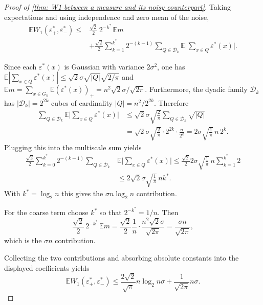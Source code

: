 \documentclass{article}
\theoremstyle{plain}
\theoremstyle{definition}
\theoremstyle{remark}
\begin{document}
\begin{proof}[Proof of \cref{thm: W1 between a measure and its noisy counterpart}]
Taking expectations and using independence and zero mean of the noise,
\begin{align}
    \mathbb{E} W_1(\varepsilon^*_+,\varepsilon^*_-)
    \le& \frac{\sqrt2}{2}\,2^{-k^*}\,\mathbb{E} m 
    \\&+ \frac{\sqrt2}{2} \sum_{k=1}^{k^*} 2^{-(k-1)} \sum_{Q\in\mathcal{D}_k} \mathbb{E}\Big| \sum_{x\in Q} \varepsilon^*(x) \Big|. \nonumber
\end{align}

Since each $\varepsilon^*(x)$ is Gaussian with variance $2\sigma^2$, one has $\mathbb{E}|\sum_{x\in Q}\varepsilon^*(x)| \le \sqrt2\sigma \sqrt{|Q|}\sqrt{2/\pi}$ and $\mathbb{E} m = \sum_{x\in G_n} \mathbb{E}(\varepsilon^*(x))_+ = n^2 \sqrt2\sigma/\sqrt{2\pi}$. Furthermore, the dyadic family $\mathcal{D}_k$ has $|\mathcal{D}_k|=2^{2k}$ cubes of cardinality $|Q|=n^2/2^{2k}$. Therefore
\begin{align}
    \sum_{Q\in\mathcal{D}_k} \mathbb{E}\Big| \sum_{x\in Q} \varepsilon^*(x) \Big|
    &\le \sqrt{2} \sigma \sqrt{\tfrac{2}{\pi}} \sum_{Q\in\mathcal{D}_k} \sqrt{|Q|}
    \\&= \sqrt{2}\sigma \sqrt{\tfrac{2}{\pi}} \cdot 2^{2k} \cdot \frac{n}{2^{k}}
    = 2\sigma \sqrt{\tfrac{1}{\pi}}\, n\, 2^{k}. \nonumber
\end{align}
Plugging this into the multiscale sum yields
\begin{align}
    \frac{\sqrt2}{2} \sum_{k=0}^{k^*} 2^{-(k-1)} \sum_{Q\in\mathcal{D}_k} &\mathbb{E}\Big| \sum_{x\in Q} \varepsilon^*(x) \Big| \nonumber
    \le \frac{\sqrt2}{2} 2 \sigma \sqrt{\tfrac{1}{\pi}}\, n \sum_{k=1}^{k^*} 2
    \\&\le 2 \sqrt2 \sigma \sqrt{\tfrac{1}{\pi}}\, n k^*.
\end{align}
With $k^*= \log_2 n$ this gives the $\sigma n \log_2 n$ contribution.

For the coarse term choose $k^*$ so that $2^{-k^*} = 1/n$. Then
\begin{equation}
    \frac{\sqrt2}{2}\,2^{-k^*}\,\mathbb{E} m 
    = \frac{\sqrt2}{2} \frac{1}{n}\cdot \frac{n^2 \sqrt2\sigma}{\sqrt{2\pi}} 
    = \frac{\sigma n}{\sqrt{2\pi}},
\end{equation}
which is the $\sigma n$ contribution.

Collecting the two contributions and absorbing absolute constants into the displayed coefficients yields
\begin{equation}\label{eq: bound on the expectation of W1 between noises}
    \mathbb{E} W_1(\varepsilon^*_+,\varepsilon^*_-)
    \le \frac{2\sqrt2}{\sqrt{\pi}} n \log_2 n \sigma+ \frac{1}{\sqrt{2\pi}} n \sigma.
\end{equation}


\end{proof}
\end{document}
